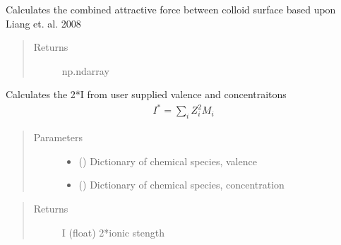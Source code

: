 \documentclass[letterpaper,10pt,english]{sphinxmanual}
\begin{document}
\begin{fulllineitems}
\begin{fulllineitems}
\begin{quote}
\begin{description}
\end{description}\end{quote}

\end{fulllineitems}


\begin{fulllineitems}
\label{\detokenize{index:lb_colloids.Colloids.Colloid_Math.DLVO.attractive_y}}
Calculates the combined attractive force between colloid surface
based upon Liang et. al. 2008
\begin{quote}\begin{description}
\item[{Returns}] \leavevmode
np.ndarray

\end{description}\end{quote}

\end{fulllineitems}


\begin{fulllineitems}
\label{\detokenize{index:lb_colloids.Colloids.Colloid_Math.DLVO.ionic}}
Calculates the 2*I from user supplied valence and concentraitons
\begin{equation*}
\begin{split}I^{*} = \sum_{i} Z_{i}^{2} M_{i}\end{split}
\end{equation*}\begin{quote}\begin{description}
\item[{Parameters}] \leavevmode\begin{itemize}
\item {} 
 () \textendash{} Dictionary of chemical species, valence

\item {} 
 () \textendash{} Dictionary of chemical species, concentration

\end{itemize}

\end{description}\end{quote}
\begin{quote}\begin{description}
\item[{Returns}] \leavevmode
I (float) 2*ionic stength


\end{description}
\end{quote}
\end{fulllineitems}
\end{fulllineitems}
\end{document}
